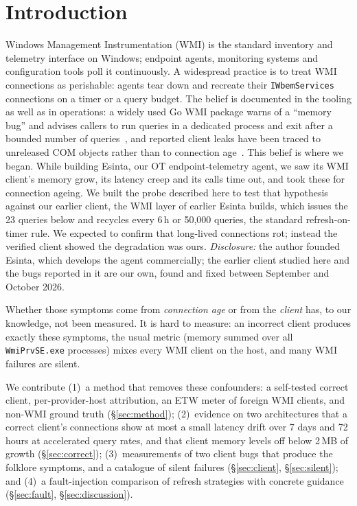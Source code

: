 \documentclass[letterpaper,twocolumn,10pt]{article}
\newcommand{\code}[1]{\texttt{\small #1}}
\begin{document}
\section{Introduction}
Windows Management Instrumentation (WMI) is the standard inventory and telemetry interface on Windows; endpoint agents, monitoring systems and configuration tools poll it continuously.
A widespread practice is to treat WMI connections as perishable: agents tear down and recreate their \code{IWbemServices} connections on a timer or a query budget.
The belief is documented in the tooling as well as in operations: a widely used Go WMI package warns of a ``memory bug'' and advises callers to run queries in a dedicated process and exit after a bounded number of queries~\cite{se-wmi}, and reported client leaks have been traced to unreleased COM objects rather than to connection age~\cite{zbx-8506}.
This belief is where we began.
While building Esinta, our OT endpoint-telemetry agent, we saw its WMI client's memory grow, its latency creep and its calls time out, and took these for connection ageing.
We built the probe described here to test that hypothesis against our earlier client, the WMI layer of earlier Esinta builds, which issues the 23 queries below and recycles every 6\,h or 50{,}000 queries, the standard refresh-on-timer rule.
We expected to confirm that long-lived connections rot; instead the verified client showed the degradation was ours.
\emph{Disclosure:} the author founded Esinta, which develops the agent commercially; the earlier client studied here and the bugs reported in it are our own, found and fixed between September and October 2026.

Whether those symptoms come from \emph{connection age} or from the \emph{client} has, to our knowledge, not been measured.
It is hard to measure: an incorrect client produces exactly these symptoms, the usual metric (memory summed over all \code{WmiPrvSE.exe} processes) mixes every WMI client on the host, and many WMI failures are silent.

We contribute (1)~a method that removes these confounders: a self-tested correct client, per-provider-host attribution, an ETW meter of foreign WMI clients, and non-WMI ground truth (\S\ref{sec:method}); (2)~evidence on two architectures that a correct client's connections show at most a small latency drift over 7 days and 72 hours at accelerated query rates, and that client memory levels off below 2\,MB of growth (\S\ref{sec:correct}); (3)~measurements of two client bugs that produce the folklore symptoms, and a catalogue of silent failures (\S\ref{sec:client}, \S\ref{sec:silent}); and (4)~a fault-injection comparison of refresh strategies with concrete guidance (\S\ref{sec:fault}, \S\ref{sec:discussion}).
\end{document}
